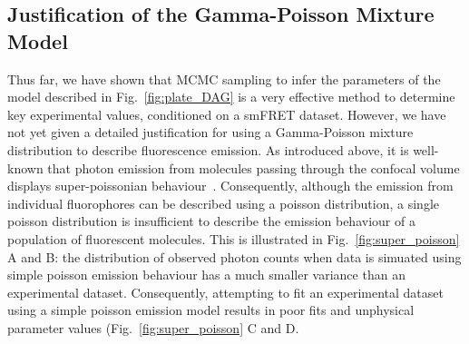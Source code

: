 \subsection{Justification of the Gamma-Poisson Mixture Model}
Thus far, we have shown that MCMC sampling to infer the parameters of the model described in Fig.~\ref{fig:plate_DAG} is a very effective method to determine key experimental values, conditioned on a smFRET dataset. However, we have not yet given a detailed justification for using a Gamma-Poisson mixture distribution to describe fluorescence emission. As introduced above, it is well-known that photon emission from molecules passing through the confocal volume displays super-poissonian behaviour~\cite{chen99}. Consequently, although the emission from individual fluorophores can be described using a poisson distribution, a single poisson distribution is insufficient to describe the emission behaviour of a population of fluorescent molecules. This is illustrated in Fig.~\ref{fig:super_poisson} A and B: the distribution of observed photon counts when data is simuated using simple poisson emission behaviour has a much smaller variance than an experimental dataset. Consequently, attempting to fit an experimental dataset using a simple poisson emission model results in poor fits and unphysical parameter values (Fig.~\ref{fig:super_poisson} C and D.


